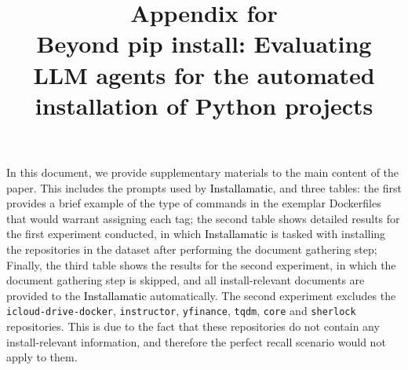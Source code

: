 \documentclass[conference]{IEEEtran}
\newcommand{\name}{\textcolor{black}{Installamatic}\xspace}
\begin{document}
\title{Appendix for \\Beyond pip install: Evaluating LLM agents for the automated installation of Python projects}

\onecolumn
\maketitle
    In this document, we provide supplementary materials to the main content of the paper. This includes the prompts used by \name, and three tables:
    the first provides a brief example of the type of commands in the exemplar Dockerfiles that would warrant assigning each tag;
    the second table shows detailed results for the first experiment conducted,
    in which \name is tasked with installing the repositories in the dataset after performing the document gathering step;
    Finally, the third table shows the results for the second experiment, in which the document gathering step is skipped,
    and all install-relevant documents are provided to the \name automatically.
    The second experiment excludes the \texttt{icloud-drive-docker}, \texttt{instructor}, \texttt{yfinance}, \texttt{tqdm}, \texttt{core} and \texttt{sherlock} repositories.
    This is due to the fact that these repositories do not contain any install-relevant information, and therefore the perfect recall scenario would not apply to them.
\end{document}
